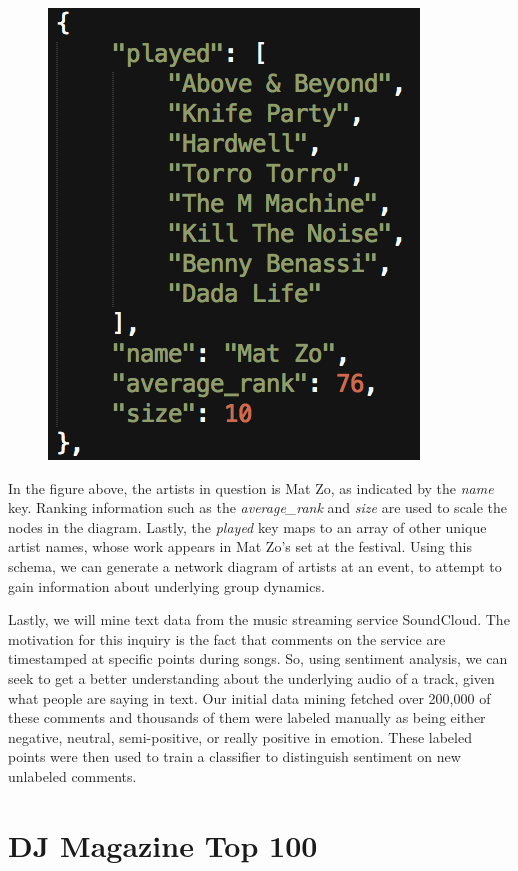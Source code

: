 \documentclass[12pt]{dalcsthesis}
\begin{document}
\begin{figure}[h]
\includegraphics[scale=.65]{ezoo_json}
\centering
\end{figure}

In the figure above, the artists in question is Mat Zo, as indicated by the \textit{name} key. Ranking information such as the \textit{average\_rank} and \textit{size} are used to scale the nodes in the diagram. Lastly, the \textit{played} key maps to an array of other unique artist names, whose work appears in Mat Zo's set at the festival. Using this schema, we can generate a network diagram of artists at an event, to attempt to gain information about underlying group dynamics.

Lastly, we will mine text data from the music streaming service SoundCloud. The motivation for this inquiry is the fact that comments on the service are timestamped at specific points during songs. So, using sentiment analysis, we can seek to get a better understanding about the underlying audio of a track, given what people are saying in text. Our initial data mining fetched over 200,000 of these comments and thousands of them were labeled manually as being either negative, neutral, semi-positive, or really positive in emotion. These labeled points were then used to train a classifier to distinguish sentiment on new unlabeled comments.


\chapter{DJ Magazine Top 100}
\end{document}
